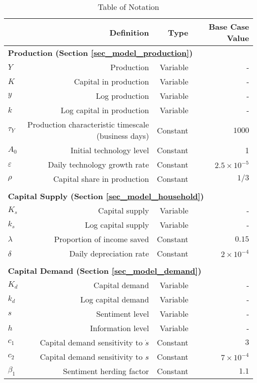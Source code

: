 \begin{table}[H]
\centering
\caption{Table of Notation} \label{tab_notation}
\begin{tabular}{lrrr}
\toprule
{} & {Definition} & {Type} & {Base Case Value}\\
\midrule
\multicolumn{4}{l}{\textbf{Production (Section \ref{sec_model_production})}}\\
$Y$    &  Production  & Variable &- \\
$K$    &  Capital in production & Variable & - \\
$y$    &  Log production  & Variable &- \\
$k$    &  Log capital in production & Variable & - \\
$\tau_Y$    & Production characteristic timescale (business days) & Constant & $1000$ \\
$A_0$    & Initial technology level  & Constant &  1 \\
$\varepsilon$    & Daily technology growth rate  & Constant & $2.5\times10^{-5}$ \\
$\rho$    &  Capital share in production & Constant  &  $1/3$ \\\\
\multicolumn{4}{l}{\textbf{Capital Supply (Section \ref{sec_model_household})}}\\
$K_s$    &  Capital supply  & Variable &- \\
$k_s$    &  Log capital supply  & Variable &- \\
$\lambda$    & Proportion of income saved  & Constant &  $0.15$ \\
$\delta$    & Daily depreciation rate  & Constant &  $2\times10^{-4}$ \\\\
\multicolumn{4}{l}{\textbf{Capital Demand (Section \ref{sec_model_demand})}}\\
$K_d$    &  Capital demand  & Variable &- \\
$k_d$    &  Log capital demand  & Variable &- \\
$s$    &  Sentiment level  & Variable &- \\
$h$    &  Information level  & Variable &- \\
$c_1$    &  Capital demand sensitivity to $\dot{s}$ & Constant & $3$ \\
$c_2$    &  Capital demand sensitivity to $s$ & Constant & $7\times10^{-4}$ \\
$\beta_1$    &  Sentiment herding factor  &  Constant& $1.1$ \\

\end{tabular}
\end{table}
